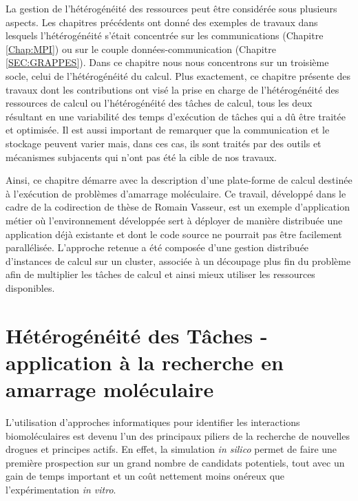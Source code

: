 \begin{resume}
La gestion de l'hétérogénéité des ressources peut être considérée sous plusieurs aspects. Les chapitres précédents ont donné des exemples de travaux dans lesquels l'hétérogénéité s'était concentrée sur les communications (Chapitre \ref{Chap:MPI}) ou sur le couple données-communication (Chapitre \ref{SEC:GRAPPES}). Dans ce chapitre nous nous concentrons sur un troisième socle, celui de l'hétérogénéité du calcul. Plus exactement, ce chapitre présente des travaux dont les contributions ont visé la prise en charge de l'hétérogénéité des ressources de calcul ou l'hétérogénéité des tâches de calcul, tous les deux résultant en une variabilité des temps d'exécution de tâches qui a dû être traitée et optimisée. Il est aussi important de remarquer que la communication et le stockage peuvent varier mais, dans ces cas, ils sont traités par des outils et mécanismes subjacents qui n'ont pas été la cible de nos travaux.

Ainsi, ce chapitre démarre avec la description d'une plate-forme de calcul destinée à l'exécution de problèmes d'amarrage moléculaire. Ce travail, développé dans le cadre de la codirection de thèse de Romain Vasseur, est un exemple d'application métier où l'environnement développée sert à déployer de manière distribuée une application déjà existante et dont le code source ne pourrait pas être facilement parallélisée. L'approche retenue a été composée d'une gestion distribuée d'instances de calcul sur un cluster, associée à un découpage plus fin du problème afin de multiplier les tâches de calcul et ainsi mieux utiliser les ressources disponibles.


\end{resume}

\section{Hétérogénéité des Tâches - application à la recherche en amarrage moléculaire} \label{sec:Vasseur}

L'utilisation d'approches informatiques pour identifier les interactions biomoléculaires est devenu l'un des principaux piliers de la recherche de nouvelles drogues et principes actifs. En effet, la simulation \emph{in silico} permet de faire une première prospection sur un grand nombre de candidats potentiels, tout avec un gain de temps important et un coût nettement moins onéreux que l'expérimentation \emph{in vitro}. 

